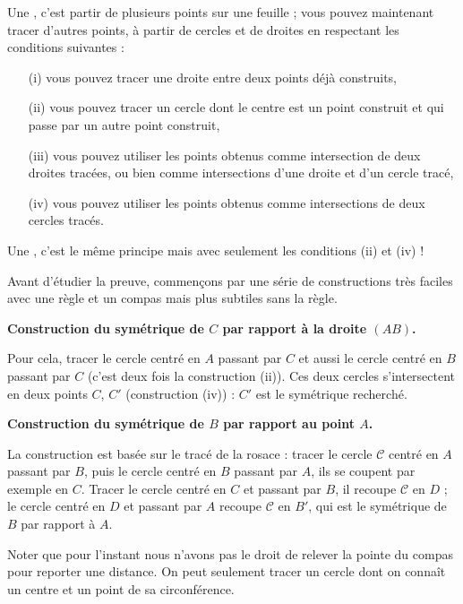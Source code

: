 \documentclass[11pt,class=report,crop=false]{standalone}
\begin{document}
Une , c'est partir de plusieurs points sur une
feuille ; vous pouvez maintenant tracer d’autres points, à partir de cercles et de droites en respectant les conditions
suivantes :
\begin{itemize}
  \item[(i)] vous pouvez tracer une droite entre deux points déjà construits,
  \item[(ii)]vous pouvez tracer un cercle dont le centre est un point construit et qui passe par un autre point construit,
  \item[(iii)] vous pouvez utiliser les points obtenus comme intersection de deux droites tracées, ou bien comme intersections d’une droite et d’un cercle tracé,
  \item[(iv)] vous pouvez utiliser les points obtenus comme intersections de deux cercles tracés.
\end{itemize}

Une , c'est le même principe mais avec seulement les conditions
(ii) et (iv) !

\bigskip

Avant d'étudier la preuve, commençons par une série de constructions très faciles avec une règle et un compas mais plus subtiles sans la règle.

\bigskip

\textbf{Construction du symétrique de $C$ par rapport à la droite $(AB)$.}

Pour cela, tracer le cercle
centré en $A$ passant par $C$ et aussi le cercle centré en $B$ passant par $C$ (c'est deux fois la construction (ii)). Ces deux cercles s’intersectent en deux
points $C$, $C'$ (construction (iv)) : 
$C'$ est le symétrique recherché.


\bigskip
\textbf{Construction du symétrique de $B$ par rapport au point $A$.}

La construction est basée sur le tracé de la rosace : tracer le cercle $\mathcal{C}$
centré en $A$ passant par $B$, puis le cercle centré en $B$ passant par $A$, 
ils se coupent par exemple en $C$. Tracer le cercle centré en $C$ et passant par $B$,
il recoupe $\mathcal{C}$ en $D$ ; le cercle centré en $D$ et passant par $A$ recoupe $\mathcal{C}$ en $B'$, qui est le symétrique de
$B$ par rapport à $A$. 



\begin{remarque*}
Noter que pour l'instant nous n'avons pas le droit de relever la pointe du compas pour reporter une distance.
On peut seulement tracer un cercle dont on connaît un centre et un point de sa circonférence.
\end{remarque*}
\end{document}
